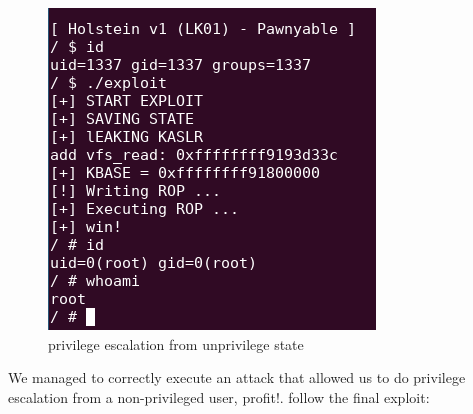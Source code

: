     
    \begin{figure}[htbp]
        \centering
        \includegraphics[width=0.5\linewidth]{Images/LPE_kernel_exploit.png}
        \caption{privilege escalation from unprivilege state}
        \label{fig:enter-label}
    \end{figure}
    We managed to correctly execute an attack that allowed us to do privilege escalation from a non-privileged user, profit!.\newline
    follow the final exploit: \newline
    